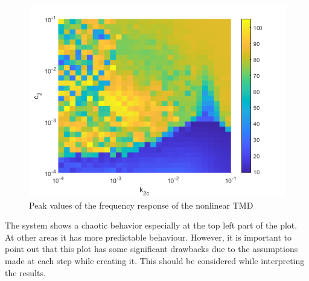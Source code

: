\begin{figure}
    \centering
    \includegraphics[scale=0.6]{MATLAB Figures/nonlinear peak.png}
    \caption{Peak values of the frequency response of the nonlinear TMD}
    \label{fig:peak_nl}
\end{figure}
\par The system shows a chaotic behavior especially at the top left part of the plot. At other areas it has more predictable behaviour. However, it is important to point out that this plot has some significant drawbacks due to the assumptions made at each step while creating it. This should be considered while interpreting the results.
